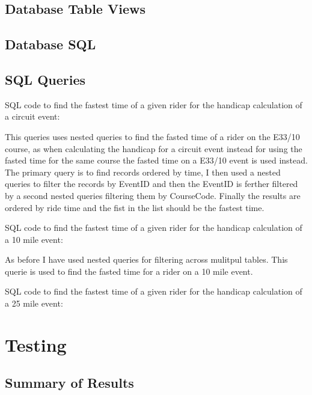 \subsection{Database Table Views}
\clearpage

\begin{landscape}
\subsection{Database SQL}
\end{landscape}
\subsection{SQL Queries}

SQL code to find the fastest time of a given rider for the handicap calculation of a circuit event:


This queries uses nested queries to find the fasted time of a rider on the E33/10 course, as when calculating the handicap for a circuit event instead for using the fasted time for the same course the fasted time on a E33/10 event is used instead. The primary query is to find records ordered by time, I then used a nested queries to filter the records by EventID and then the EventID is ferther filtered by a second nested queries filtering them by CourseCode. Finally the results are ordered by ride time and the fist in the list should be the fastest time.

SQL code to find the fastest time of a given rider for the handicap calculation of a 10 mile event:


As before I have used nested queries for filtering across mulitpul tables. This querie is used to find the fasted time for a rider on a 10 mile event. 

SQL code to find the fastest time of a given rider for the handicap calculation of a 25 mile event:


\section{Testing}

\subsection{Summary of Results}

